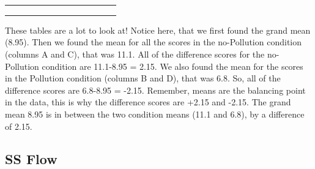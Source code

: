 \documentclass[
  letterpaper,
  DIV=11,
  numbers=noendperiod]{scrreprt}
\begin{document}
\begin{table}
\begin{tabular}{l|l|l|l|l|l|l|l|l|>{}l|>{}l|>{}l|>{}l}
\hline
\cellcolor{lightgray}{Means} & \cellcolor{lightgray}{9.6} & \cellcolor{lightgray}{3.6} & \cellcolor{lightgray}{12.6} & \cellcolor{lightgray}{10} & \cellcolor{lightgray}{} & \cellcolor{lightgray}{} & \cellcolor{lightgray}{} & \cellcolor{lightgray}{} & \cellcolor{yellow}{} & \cellcolor{yellow}{} & \cellcolor{yellow}{} & \cellcolor{yellow}{}\\
\hline
\cellcolor{lightgray}{Grand Mean} & \cellcolor{lightgray}{8.95} & \cellcolor{lightgray}{No Pollution} & \cellcolor{lightgray}{11.1} & \cellcolor{lightgray}{Pollution} & \cellcolor{lightgray}{6.8} & \cellcolor{lightgray}{} & \cellcolor{lightgray}{} & \cellcolor{lightgray}{} & \cellcolor{yellow}{} & \cellcolor{yellow}{} & \cellcolor{yellow}{} & \cellcolor{yellow}{}\\
\hline
\cellcolor{yellow}{sums} & \cellcolor{yellow}{} & \cellcolor{yellow}{} & \cellcolor{yellow}{} & \cellcolor{yellow}{} & \cellcolor{yellow}{} & \cellcolor{yellow}{} & \cellcolor{yellow}{} & \cellcolor{yellow}{Sums} & \cellcolor{yellow}{23.1125} & \cellcolor{yellow}{23.1125} & \cellcolor{yellow}{23.1125} & \cellcolor{yellow}{23.1125}\\
\hline
\cellcolor{yellow}{SS Pollution} & \cellcolor{yellow}{} & \cellcolor{yellow}{} & \cellcolor{yellow}{} & \cellcolor{yellow}{} & \cellcolor{yellow}{} & \cellcolor{yellow}{} & \cellcolor{yellow}{} & \cellcolor{yellow}{SS Pollution} & \cellcolor{yellow}{92.45} & \cellcolor{yellow}{} & \cellcolor{yellow}{} & \cellcolor{yellow}{}\\
\hline
\end{tabular}
\end{table}

These tables are a lot to look at! Notice here, that we first found the
grand mean (8.95). Then we found the mean for all the scores in the
no-Pollution condition (columns A and C), that was 11.1. All of the
difference scores for the no-Pollution condition are 11.1-8.95 = 2.15.
We also found the mean for the scores in the Pollution condition
(columns B and D), that was 6.8. So, all of the difference scores are
6.8-8.95 = -2.15. Remember, means are the balancing point in the data,
this is why the difference scores are +2.15 and -2.15. The grand mean
8.95 is in between the two condition means (11.1 and 6.8), by a
difference of 2.15.

\subsection{SS Flow}\label{ss-flow}
\end{document}

